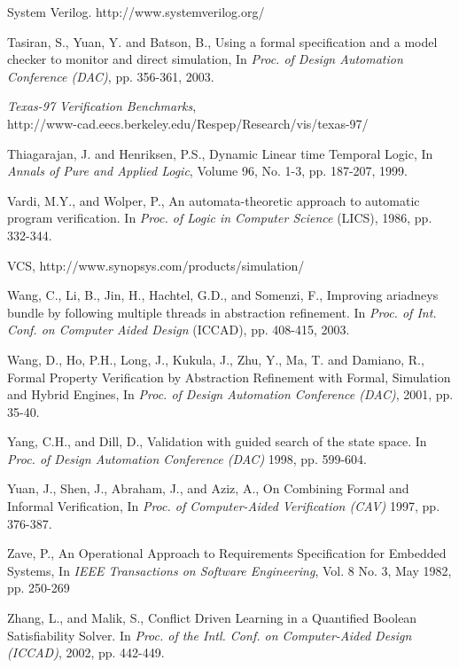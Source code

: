 {\begin{thebibliography}{99}

 System Verilog. http://www.systemverilog.org/

 Tasiran, S., Yuan, Y. and Batson, B., Using a formal
        specification and a model checker to monitor and direct
        simulation, In {\em Proc. of Design Automation Conference (DAC)}, 
        pp. 356-361, 2003.

 {\em Texas-97 Verification Benchmarks}, \\
    http://www-cad.eecs.berkeley.edu/Respep/Research/vis/texas-97/

 Thiagarajan, J. and Henriksen, P.S.,
        Dynamic Linear time Temporal Logic,
        In {\em Annals of Pure and Applied Logic}, Volume 96, No. 1-3,
        pp. 187-207, 1999. 

 Vardi, M.Y., and Wolper, P., An automata-theoretic approach
	to automatic program verification. In {\em Proc. of Logic in Computer
	Science} (LICS), 1986, pp. 332-344.


 VCS,
        http://www.synopsys.com/products/simulation/ 

 Wang, C., Li, B., Jin, H., Hachtel, G.D., and Somenzi, F.,
	Improving ariadneys bundle by following multiple threads in
	abstraction refinement. In {\em Proc. of Int. Conf. on Computer
	Aided Design} (ICCAD), pp. 408-415, 2003.

 Wang, D., Ho, P.H., Long, J., Kukula, J., 
	Zhu, Y., Ma, T. and Damiano, R., Formal Property Verification by
        Abstraction Refinement with Formal, Simulation and Hybrid
        Engines, In {\em Proc. of Design Automation Conference (DAC)}, 
	2001, pp. 35-40.

 Yang, C.H., and Dill, D., Validation with guided
        search of the state space. In {\em Proc. of Design Automation 
	Conference (DAC)} 1998, pp. 599-604. 

 Yuan, J., Shen, J., Abraham, J., and Aziz, A.,
        On Combining Formal and Informal Verification, In
        {\em Proc. of Computer-Aided Verification (CAV)} 1997, pp. 376-387.

 Zave, P., An Operational Approach to Requirements 
	Specification for Embedded Systems, In {\em IEEE Transactions on 
	Software Engineering}, Vol. 8 No. 3, May 1982, pp. 250-269

 Zhang, L., and Malik, S., Conflict Driven Learning in a
        Quantified Boolean Satisfiability Solver. In {\em Proc. of the Intl.
        Conf. on Computer-Aided Design (ICCAD)}, 2002, pp. 442-449.

\end{thebibliography}
}
